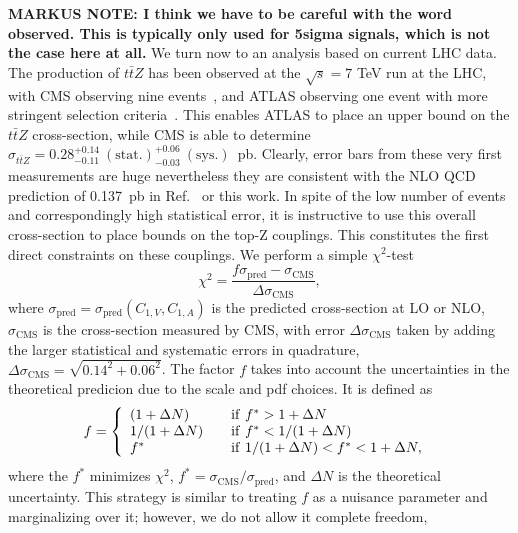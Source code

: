 \documentclass[preprint]{JHEP3} %
\def\ttbZ{t\bar{t}Z}
\begin{document}
{\bf MARKUS NOTE: I think we have to be careful with the word observed. This is typically only used for 5sigma signals, which is not the case here at all.}
We turn now to an analysis based on current LHC data. The production of $\ttbZ$ has been observed at the $\sqrt{s}=7$ TeV run at the LHC, 
with CMS observing nine events~\cite{Chatrchyan:2013qca}, and ATLAS observing one event with more stringent selection criteria~\cite{ATLAS-CONF-2012-126}. 
This enables ATLAS to place an upper bound on the $\ttbZ$ cross-section, 
while CMS is able to determine $\sigma_{\ttbZ} = 0.28^{+0.14}_{-0.11}~\mathrm{(stat.)}^{+0.06}_{-0.03}~ \mathrm{(sys.)}$~pb. 
Clearly, error bars from these very first measurements are huge nevertheless they are consistent with the NLO QCD prediction of 0.137~pb in Ref.~\cite{Garzelli:2011is} or this work. 
In spite of the low number of events and correspondingly high statistical error, it is instructive to use this overall cross-section to place bounds on the top-Z couplings. 
This constitutes the first direct constraints on these couplings.
We perform a simple $\chi^2$-test 
\begin{equation}
\chi^2 = \frac{f \sigma_{\mathrm{pred}} - \sigma_{\mathrm{CMS}}}{\Delta \sigma_{\mathrm{CMS}}},
\end{equation}
where $\sigma_{\mathrm{pred}}=\sigma_{\mathrm{pred}}(C_{1,V},C_{1,A})$ is the predicted cross-section at LO or NLO, 
$\sigma_{\mathrm{CMS}}$ is the cross-section measured by CMS, with error $\Delta \sigma_{\mathrm{CMS}}$ taken by adding the larger 
statistical and systematic errors in quadrature, $\Delta \sigma_{\mathrm{CMS}}=\sqrt{0.14^2+0.06^2}$. 
The factor $f$ takes into account the uncertainties in the theoretical predicion due to the scale and pdf choices. 
It is defined as~\cite{Baur:2004uw,Baur:2005wi}
 \begin{equation}
f = \left\{ 
\begin{array} {l l}
(1+\Delta N)  & \quad \mathrm{if}~ f^* > 1 + \Delta N \\
1/(1+\Delta N)  & \quad \mathrm{if}~ f^* < 1/(1 + \Delta N) \\
f^* & \quad \mathrm{if}~ 1/(1 + \Delta N) < f^* < 1+\Delta N,
\end{array} \right.\ 
\end{equation}  
where the $f^*$ minimizes $\chi^2$, $f^* = \sigma_{\mathrm{CMS}} / \sigma_{\mathrm{pred}}$, and $\Delta N$ is the theoretical  uncertainty. 
This strategy is similar to treating $f$ as a nuisance parameter and marginalizing over it; however, we do not allow it complete freedom, 
\end{document}
